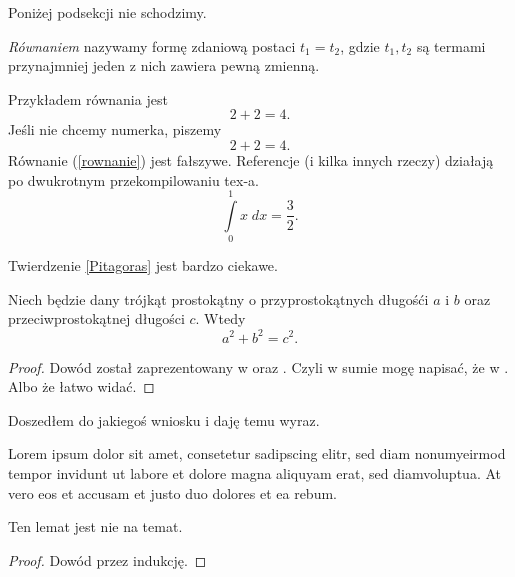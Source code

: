 \documentclass[en]{minipw} %
\begin{document}
Poniżej podsekcji nie schodzimy.

\begin{definition}
\textit{Równaniem} nazywamy formę zdaniową postaci $t_1 = t_2$, gdzie $t_1, t_2$ są termami przynajmniej jeden z nich zawiera pewną zmienną.
\end{definition}

\begin{example}
Przykładem równania jest
\begin{equation}
2+2=4.
\end{equation}
Jeśli nie chcemy numerka, piszemy
\begin{equation*}
2+2=4.
\end{equation*}
Równanie (\ref{rownanie}) jest fałszywe. Referencje (i kilka innych rzeczy) działają po dwukrotnym przekompilowaniu tex-a.
\begin{equation}\label{rownanie}
\int \limits_{0}^{1} x \; dx = \frac{3}{2}.
\end{equation}

\end{example}

Twierdzenie \ref{Pitagoras} jest bardzo ciekawe.

\begin{theorem}\label{Pitagoras}
Niech będzie dany trójkąt prostokątny o przyprostokątnych długośći $a$ i $b$ oraz przeciwprostokątnej długości $c$. Wtedy
\[
a^2 + b^2 = c^2.
\]
\end{theorem}

\begin{proof}
Dowód został zaprezentowany w \cite{Ktos} oraz \cite{Innyktos}. Czyli w sumie mogę napisać, że w \cite{Ktos, Innyktos}. Albo że łatwo widać.
\end{proof}

\begin{corollary}
Doszedłem do jakiegoś wniosku i daję temu wyraz.
\end{corollary}




\begin{remark}
Lorem ipsum dolor sit amet, consetetur sadipscing elitr, sed diam nonumyeirmod tempor invidunt ut labore et dolore magna aliquyam erat, sed diamvoluptua. At vero eos et accusam et justo duo dolores et ea rebum.
\end{remark}

\begin{lemma}[Lemacik]
Ten lemat jest nie na temat.
\end{lemma}
\begin{proof} Dowód przez indukcję.
\end{proof}
\end{document}
